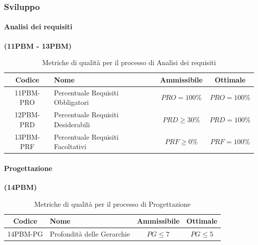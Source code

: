 \documentclass{article}
\begin{document}
\subsubsection{Sviluppo} %
\paragraph{Analisi dei requisiti}%
\textbf{(11PBM - 13PBM)}

\begin{table}[H]
\centering
\renewcommand{\arraystretch}{1.5} %
\begin{tabular}{|c|l|c|c|}
    \hline
    \textbf{Codice} & \textbf{Nome} & \textbf{Ammissibile} & \textbf{Ottimale} \\
    \hline
    11PBM-PRO & Percentuale Requisiti Obbligatori & $PRO = 100\%$ & $PRO = 100\%$ \\
    12PBM-PRD & Percentuale Requisiti Desiderabili & $PRD \geq 30\%$ & $PRD = 100\%$ \\
    13PBM-PRF & Percentuale Requisiti Facoltativi & $PRF \geq 0\%$ & $PRF = 100\%$ \\
    \hline
\end{tabular}
\label{tab:analisi_requisiti}
\caption{Metriche di qualità per il processo di Analisi dei requisiti}
\end{table}

\paragraph{Progettazione}%
\textbf{(14PBM)}
\begin{table}[H]
    \centering
    \renewcommand{\arraystretch}{1.5} %
    \begin{tabular}{|c|l|c|c|}
        \hline
        \textbf{Codice} & \textbf{Nome} & \textbf{Ammissibile} & \textbf{Ottimale} \\
        \hline
        14PBM-PG & Profondità delle Gerarchie & $PG \leq 7$ & $PG \leq 5$ \\
        \hline
    \end{tabular}
    \label{tab:progettazione}
    \caption{Metriche di qualità per il processo di Progettazione}
\end{table}
\end{document}
